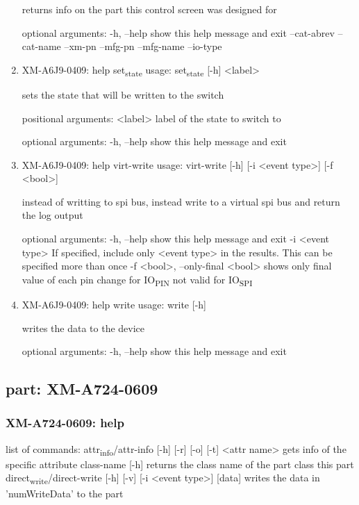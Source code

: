 \documentclass[11pt]{article}
\begin{document}
\begin{enumerate}
returns info on the part this control screen was designed for

optional arguments:
  -h, --help   show this help message and exit
  --cat-abrev
  --cat-name
  --xm-pn
  --mfg-pn
  --mfg-name
  --io-type

\item XM-A6J9-0409: help set\textsubscript{state}
\label{sec:org0b9340a}
usage: set\textsubscript{state} [-h] <label>

sets the state that will be written to the switch

positional arguments:
  <label>     label of the state to switch to

optional arguments:
  -h, --help  show this help message and exit

\item XM-A6J9-0409: help virt-write
\label{sec:org6f35420}
usage: virt-write [-h] [-i <event type>] [-f <bool>]

instead of writting to spi bus, instead write to a virtual spi bus and return
the log output

optional arguments:
  -h, --help            show this help message and exit
  -i <event type>       If specified, include only <event type> in the
                        results. This can be specified more than once
  -f <bool>, --only-final <bool>
                        shows only final value of each pin change for IO\textsubscript{PIN}
                        not valid for IO\textsubscript{SPI}

\item XM-A6J9-0409: help write
\label{sec:orgb6b440d}
usage: write [-h]

writes the data to the device

optional arguments:
  -h, --help  show this help message and exit
\end{enumerate}

\subsection{part: XM-A724-0609}
\label{sec:org12819aa}
\subsubsection{XM-A724-0609: help}
\label{sec:org229684c}
list of commands:
  attr\textsubscript{info}/attr-info [-h] [-r] [-o] [-t] <attr name>
    gets info of the specific attribute
  class-name [-h]
    returns the class name of the part class this part
  direct\textsubscript{write}/direct-write [-h] [-v] [-i <event type>] [data]
    writes the data in 'numWriteData' to the part
\end{document}
